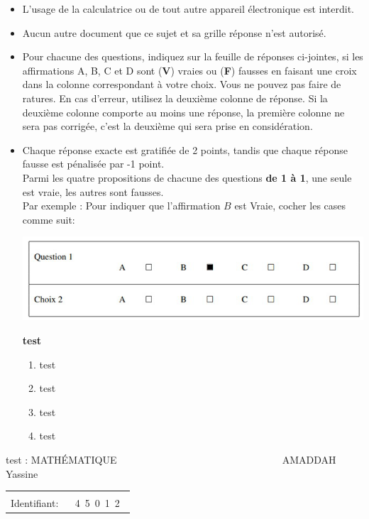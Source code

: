 \documentclass{book}%
\begin{document}
\begin{itemize}%
\item%
L'usage de la calculatrice ou de tout autre appareil électronique est interdit.%
\item%
Aucun autre document que ce sujet et sa grille réponse n'est autorisé.%
\item%
Pour chacune des questions, indiquez sur la feuille de réponses ci-jointes, si les affirmations A, B, C et D sont (\textbf{V}) vraies ou (\textbf{F}) fausses en faisant une croix dans la colonne correspondant à votre choix. Vous ne pouvez pas faire de ratures. En cas d'erreur, utilisez la deuxième colonne de réponse. Si la deuxième colonne comporte au moins une réponse, la première colonne ne sera pas corrigée, c'est la deuxième qui sera prise en considération.%
\item%
Chaque réponse exacte est gratifiée de 2 points, tandis que chaque réponse fausse est pénalisée par -1 point. \\ 	Parmi les quatre propositions de chacune des questions \textbf{de 1 à 1}, une seule est vraie, les autres sont fausses. \\ 	Par exemple : Pour indiquer que l'affirmation $B$ est Vraie, cocher les cases comme suit:  \\ \begin{center}	\includegraphics[scale=0.8]{reponses.png} \end{center}%
\thispagestyle{empty}%
\begin{exercise}%
\textbf{test }%
\begin{enumerate}[label=\textbf{\Alph*. }]%
\item%
test%
\item%
test%
\item%
test%
\item%
test%
\end{enumerate}%
\end{exercise}%
\end{itemize}%
\newpage%
\thispagestyle{empty}%
test : MATHÉMATIQUE $\qquad \qquad \qquad \qquad \qquad \qquad \qquad \qquad$ AMADDAH Yassine%
\begin{flushright}%
\begin{tabular}{|l|}%
\hline%
 \\%
\thispagestyle{empty}%
Identifiant: $\quad$ {\Large 4~5~0~1~2~}%
 \\%
\hline%
\end{tabular}%
\end{flushright}%
\end{document}
